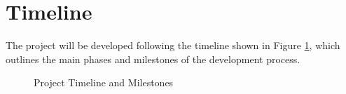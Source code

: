 \documentclass[a4paper,twoside,11pt]{article}
\begin{document}
\section*{Timeline}
The project will be developed following the timeline shown in Figure \ref{fig:project-plan}, which outlines the main phases and milestones of the development process.
\begin{figure}[h]
	\begin{center}
	\end{center}
	\caption{Project Timeline and Milestones}\label{fig:project-plan}
\end{figure}
\end{document}
